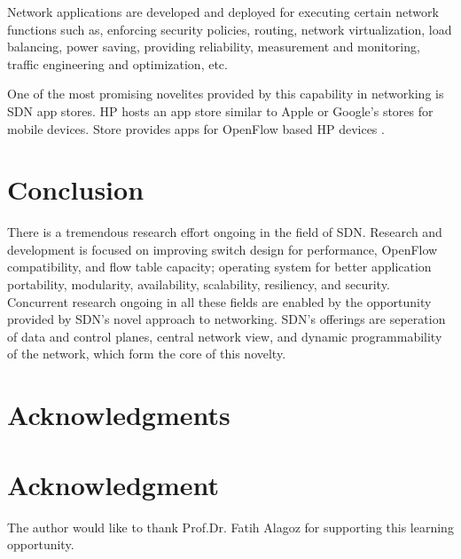 \documentclass[12pt,journal,compsoc]{IEEEtran}
\begin{document}
Network applications are developed and deployed for executing 
certain network functions such as, 
enforcing security policies, routing, network virtualization, load balancing,
 power saving, providing reliability, measurement and monitoring,
 traffic engineering and optimization, etc.

One of the most promising novelites provided by this capability in 
networking is SDN app stores. HP hosts an app store similar to Apple or
 Google's stores for mobile devices. Store provides apps for OpenFlow
 based HP devices \cite{hede}.
\section{Conclusion}
There is a tremendous research effort ongoing in the field of SDN. Research
 and development is focused on improving switch design for performance, 
OpenFlow compatibility, and flow table capacity; operating system for better
 application portability, modularity, availability, scalability, resiliency, 
and security. Concurrent research ongoing in all these fields are enabled by
 the opportunity provided by SDN's novel approach to networking. SDN's 
offerings are seperation of data and control planes, central network view, and 
dynamic programmability of the network, which form the core of this novelty.

\ifCLASSOPTIONcompsoc
  \section*{Acknowledgments}
\else
  \section*{Acknowledgment}
\fi


The author would like to thank Prof.Dr. Fatih Alagoz for supporting this learning opportunity.


\ifCLASSOPTIONcaptionsoff
  \newpage
\fi
\end{document}
